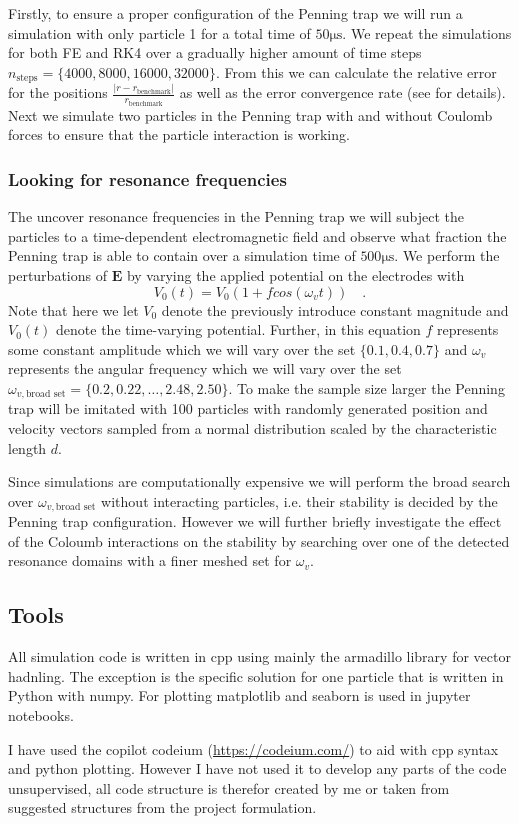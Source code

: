 \documentclass[../main_proj3.tex]{subfiles}
\begin{document}
Firstly, to ensure a proper configuration of the Penning trap we will run a simulation with only particle 1 for a total time of $50 \mathrm{\mu s}$. We repeat the simulations for both FE and RK4 over a gradually higher amount of time steps $n_{\text{steps}} = \{4000, 8000, 16000, 32000\}$. From this we can calculate the relative error for the positions $\frac{|r-r_{\text{benchmark}}|}{r_{\text{benchmark}}}$ as well as the error convergence rate (see \cite{prosjekttbeskrivelse3} for details). Next we simulate two particles in the Penning trap with and without Coulomb forces to ensure that the particle interaction is working.

\subsubsection{Looking for resonance frequencies}

The uncover resonance frequencies in the Penning trap we will subject the particles to a time-dependent electromagnetic field and observe what fraction the Penning trap is able to contain over a simulation time of $500 \mathrm{\mu s}$. We perform the perturbations of $\mathbf{E}$ by varying the applied potential on the electrodes with $$
V_0(t) = V_0(1+fcos(\omega_vt))\quad. 
$$
Note that here we let $V_0$ denote the previously introduce constant magnitude and $V_0(t)$ denote the time-varying potential. Further, in this equation $f$ represents some constant amplitude which we will vary over the set $\{0.1,0.4,0.7\}$ and $\omega_v$ represents the angular frequency which we will vary over the set $\omega_{v, \text{broad set}} = \{0.2, 0.22, \dots, 2.48, 2.50\}$. To make the sample size larger the Penning trap will be imitated with 100 particles with randomly generated position and velocity vectors sampled from a normal distribution scaled by the characteristic length $d$.

Since simulations are computationally expensive we will perform the broad search over $\omega_{v, \text{broad set}}$ without interacting particles, i.e. their stability is decided by the Penning trap configuration. However we will further briefly investigate the effect of the Coloumb interactions on the stability by searching over one of the detected resonance domains with a finer meshed set for $\omega_v$.

\subsection{Tools}

All simulation code is written in cpp using mainly the armadillo library for vector hadnling. The exception is the specific solution for one particle that is written in Python with numpy. For plotting matplotlib and seaborn is used in jupyter notebooks. 

I have used the copilot codeium (\href{https://codeium.com/}{https://codeium.com/}) to aid with cpp syntax and python plotting. However I have not used it to develop any parts of the code unsupervised, all code structure is therefor created by me or taken from suggested structures from the project formulation.
\end{document}
